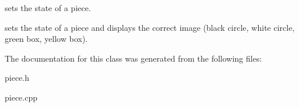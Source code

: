 sets the state of a piece. 

sets the state of a piece and displays the correct image (black circle, white circle, green box, yellow box). 

The documentation for this class was generated from the following files\+:\begin{DoxyCompactItemize}
\item 
piece.\+h\item 
piece.\+cpp\end{DoxyCompactItemize}
